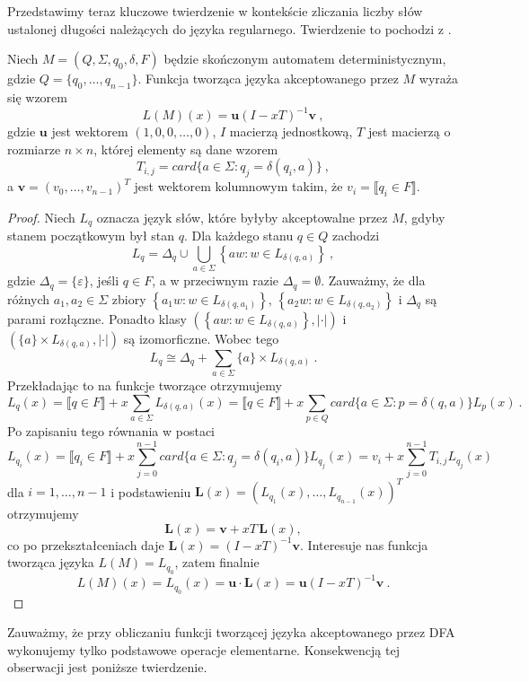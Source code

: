 Przedstawimy teraz kluczowe twierdzenie w kontekście zliczania liczby słów ustalonej długości należących do języka regularnego. Twierdzenie to pochodzi z \cite{Flajolet_08}.


\begin{theorem}\label{generic_function_dfa}
    Niech $M=(Q,\Sigma,q_0,\delta,F)$ będzie skończonym automatem deterministycznym, gdzie $Q=\{q_0,\dotsc,q_{n-1}\}$. Funkcja tworząca języka akceptowanego przez $M$ wyraża się wzorem
    $$L(M)(x)=\mathbf{u}(I-xT)^{-1}\mathbf{v}~,$$
    gdzie $\mathbf{u}$ jest wektorem $(1,0,0,\dotsc,0)$, $I$ macierzą jednostkową, $T$ jest macierzą o rozmiarze $n\times n$, której elementy są dane wzorem
    $$T_{i,j}=card\{a\in\Sigma: q_j=\delta(q_i,a)\}~,$$
    a $\mathbf{v}=(v_0,\dotsc,v_{n-1})^T$ jest wektorem kolumnowym takim, że $v_i=\llbracket q_i\in F \rrbracket$.
\end{theorem}
\begin{proof}
    Niech $L_q$ oznacza język słów, które byłyby akceptowalne przez $M$, gdyby stanem początkowym był stan $q$. Dla każdego stanu $q\in Q$ zachodzi
    $$L_q=\Delta_q\cup\bigcup_{a\in\Sigma}{\left\{aw: w\in L_{\delta(q,a)}\right\}}~,$$
    gdzie $\Delta_q=\{\varepsilon\}$, jeśli $q\in F$, a w przeciwnym razie $\Delta_q=\emptyset$. Zauważmy, że dla różnych $a_1,a_2\in\Sigma$ zbiory $\left\{a_1w: w\in L_{\delta(q,a_1)}\right\}$, $\left\{a_2w: w\in L_{\delta(q,a_2)}\right\}$ i $\Delta_q$ są parami rozłączne. Ponadto klasy $(\left\{aw: w\in L_{\delta(q,a)}\right\},|\cdot|)$ i $(\{a\}\times L_{\delta(q,a)},|\cdot|)$ są izomorficzne. Wobec tego
    $$L_q\cong\Delta_q+\sum_{a\in\Sigma}{\{a\}\times L_{\delta(q,a)}}~.$$
    Przekładając to na funkcje tworzące otrzymujemy
    $$L_q(x)=\llbracket q\in F\rrbracket+x\sum_{a\in\Sigma}{L_{\delta(q,a)}(x)}=\llbracket q\in F\rrbracket+x\sum_{p\in Q}{card\{a\in\Sigma:p=\delta(q,a)\}L_p(x)}~.$$
    Po zapisaniu tego równania w postaci
    $$L_{q_i}(x)=\llbracket q_i\in F\rrbracket+x\sum_{j=0}^{n-1}{card\{a\in\Sigma:q_j=\delta(q_i,a)\}L_{q_j}(x)}=v_i+x\sum_{j=0}^{n-1}{T_{i,j}L_{q_j}(x)}$$
    dla $i=1,\dotsc,n-1$ i podstawieniu $\mathbf{L}(x)=(L_{q_1}(x),\dotsc,L_{q_{n-1}}(x))^T$ otrzymujemy
    $$\mathbf{L}(x)=\mathbf{v}+xT\,\mathbf{L}(x),$$
    co po przekształceniach daje $\mathbf{L}(x)=(I-xT)^{-1}\mathbf{v}$. Interesuje nas funkcja tworząca języka $L(M)=L_{q_0}$, zatem finalnie
    $$L(M)(x)=L_{q_0}(x)=\mathbf{u}\cdot\mathbf{L}(x)=\mathbf{u}(I-xT)^{-1}\mathbf{v}~.$$
\end{proof}

Zauważmy, że przy obliczaniu funkcji tworzącej języka akceptowanego przez DFA wykonujemy tylko podstawowe operacje elementarne. Konsekwencją tej obserwacji jest poniższe twierdzenie.

